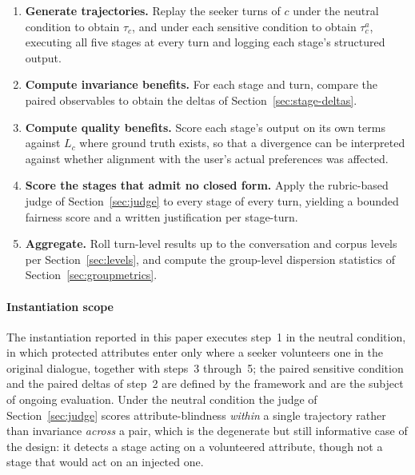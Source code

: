 \documentclass[manuscript,screen,review]{acmart}
\begin{document}
\begin{enumerate}
  \item \textbf{Generate trajectories.} Replay the seeker turns of $c$ under the
    neutral condition to obtain $\tau_c$, and under each sensitive condition to
    obtain $\tau^{a}_c$, executing all five stages at every turn and logging each
    stage's structured output.
  \item \textbf{Compute invariance benefits.} For each stage and turn, compare the
    paired observables to obtain the deltas of Section~\ref{sec:stage-deltas}.
  \item \textbf{Compute quality benefits.} Score each stage's output on its own
    terms against $L_c$ where ground truth exists, so that a divergence can be
    interpreted against whether alignment with the user's actual preferences was
    affected.
  \item \textbf{Score the stages that admit no closed form.} Apply the
    rubric-based judge of Section~\ref{sec:judge} to every stage of every turn,
    yielding a bounded fairness score and a written justification per stage-turn.
  \item \textbf{Aggregate.} Roll turn-level results up to the conversation and
    corpus levels per Section~\ref{sec:levels}, and compute the group-level
    dispersion statistics of Section~\ref{sec:groupmetrics}.
\end{enumerate}

\paragraph{Instantiation scope}
The instantiation reported in this paper executes step~1 in the neutral condition,
in which protected attributes enter only where a seeker volunteers one in the
original dialogue, together with steps~3 through~5; the paired sensitive condition
and the paired deltas of step~2 are defined by the framework and are the subject
of ongoing evaluation. Under the neutral condition the judge of
Section~\ref{sec:judge} scores attribute-blindness \emph{within} a single
trajectory rather than invariance \emph{across} a pair, which is the degenerate
but still informative case of the design: it detects a stage acting on a
volunteered attribute, though not a stage that would act on an injected one.


\end{document}
